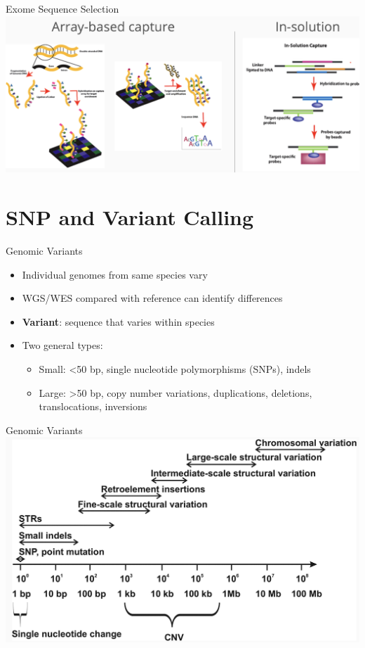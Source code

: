 \documentclass[
  ignorenonframetext,
]{beamer}
\providecommand{\tightlist}{%
  \setlength{\itemsep}{0pt}\setlength{\parskip}{0pt}}
\begin{document}
\begin{frame}{Exome Sequence Selection}
\label{exome-sequence-selection}
\includegraphics{figs/exome_selection.png}
\end{frame}

\section{SNP and Variant Calling}\label{snp-and-variant-calling}

\begin{frame}{Genomic Variants}
\label{genomic-variants}
\Large

\begin{itemize}
\tightlist
\item
  Individual genomes from same species vary
\item
  WGS/WES compared with reference can identify differences
\item
  \textbf{Variant}: sequence that varies within species
\item
  Two general types:

  \begin{itemize}
  \tightlist
  \item
    Small: \textless50 bp, single nucleotide polymorphisms (SNPs),
    indels
  \item
    Large: \textgreater50 bp, copy number variations, duplications,
    deletions, translocations, inversions
  \end{itemize}
\end{itemize}
\end{frame}

\begin{frame}{Genomic Variants}
\label{genomic-variants-1}
\includegraphics{figs/variant_defs.png}
\end{frame}
\end{document}
